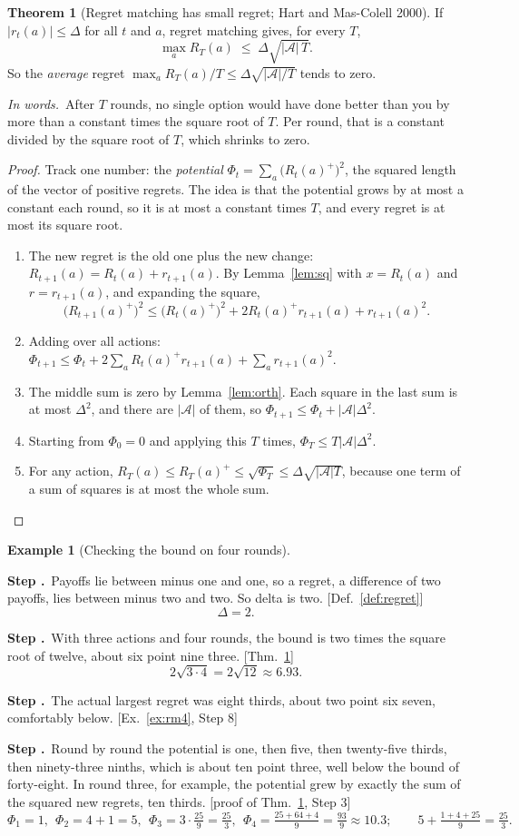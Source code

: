 \documentclass[11pt]{article}
\theoremstyle{definition}
\newtheorem{example}[definition]{Example}
\newtheorem{theorem}[definition]{Theorem}
\newcommand{\inwords}{\par\smallskip\noindent\textit{In words.}\ }
\newcounter{stp}
\newcommand{\steps}{\setcounter{stp}{0}}
\newcommand{\st}{\stepcounter{stp}\par\medskip\noindent\textbf{Step \arabic{stp}.}\ }
\newcommand{\by}[1]{\hfill{\small\color{blue!50!black}[#1]}}
\newcommand{\Def}[1]{Def.~\ref{#1}}\newcommand{\Lem}[1]{Lemma~\ref{#1}}\newcommand{\Thm}[1]{Thm.~\ref{#1}}
\newcommand{\Ex}[1]{Ex.~\ref{#1}}\newcommand{\Rem}[1]{Remark~\ref{#1}}\newcommand{\Alg}[1]{Alg.~\ref{#1}}\newcommand{\Cor}[1]{Cor.~\ref{#1}}
\begin{document}
\begin{theorem}[Regret matching has small regret; Hart and Mas-Colell 2000]\label{thm:rm}
If $|r_t(a)|\le\Delta$ for all $t$ and $a$, regret matching gives, for every $T$,
\[ \max_aR_T(a)\;\le\;\Delta\sqrt{|\mathcal A|\,T}. \]
So the \emph{average} regret $\max_aR_T(a)/T\le\Delta\sqrt{|\mathcal A|/T}$ tends to zero.
\inwords After $T$ rounds, no single option would have done better than you by more than a constant times the square
root of $T$. Per round, that is a constant divided by the square root of $T$, which shrinks to zero.
\end{theorem}
\begin{proof}
Track one number: the \emph{potential} $\Phi_t=\sum_a\big(R_t(a)^+\big)^2$, the squared length of the vector of positive
regrets. The idea is that the potential grows by at most a constant each round, so it is at most a constant times $T$,
and every regret is at most its square root.
\begin{enumerate}[nosep]
\item The new regret is the old one plus the new change: $R_{t+1}(a)=R_t(a)+r_{t+1}(a)$. By \Lem{lem:sq} with $x=R_t(a)$ and
$r=r_{t+1}(a)$, and expanding the square,
\[\big(R_{t+1}(a)^+\big)^2\le\big(R_t(a)^+\big)^2+2R_t(a)^+r_{t+1}(a)+r_{t+1}(a)^2.\]
\item Adding over all actions: $\Phi_{t+1}\le\Phi_t+2\sum_aR_t(a)^+r_{t+1}(a)+\sum_ar_{t+1}(a)^2$.
\item The middle sum is zero by \Lem{lem:orth}. Each square in the last sum is at most $\Delta^2$, and there are
$|\mathcal A|$ of them, so $\Phi_{t+1}\le\Phi_t+|\mathcal A|\Delta^2$.
\item Starting from $\Phi_0=0$ and applying this $T$ times, $\Phi_T\le T|\mathcal A|\Delta^2$.
\item For any action, $R_T(a)\le R_T(a)^+\le\sqrt{\Phi_T}\le\Delta\sqrt{|\mathcal A|T}$, because one term of a sum of squares
is at most the whole sum.\qedhere
\end{enumerate}
\end{proof}

\begin{example}[Checking the bound on four rounds]\label{ex:rmbound}
\steps
\st Payoffs lie between minus one and one, so a regret, a difference of two payoffs, lies between minus two and two. So
delta is two. \by{\Def{def:regret}}
\[ \Delta=2. \]
\st With three actions and four rounds, the bound is two times the square root of twelve, about six point nine three.
\by{\Thm{thm:rm}}
\[ 2\sqrt{3\cdot4}=2\sqrt{12}\approx6.93. \]
\st The actual largest regret was eight thirds, about two point six seven, comfortably below. \by{\Ex{ex:rm4}, Step 8}
\st Round by round the potential is one, then five, then twenty-five thirds, then ninety-three ninths, which is about ten
point three, well below the bound of forty-eight. In round three, for example, the potential grew by exactly the sum of
the squared new regrets, ten thirds. \by{proof of \Thm{thm:rm}, Step 3}
\[ \Phi_1=1,\ \ \Phi_2=4+1=5,\ \ \Phi_3=3\cdot\tfrac{25}9=\tfrac{25}3,\ \ \Phi_4=\tfrac{25+64+4}9=\tfrac{93}9\approx10.3;\qquad 5+\tfrac{1+4+25}9=\tfrac{25}3. \]
\end{example}
\end{document}
